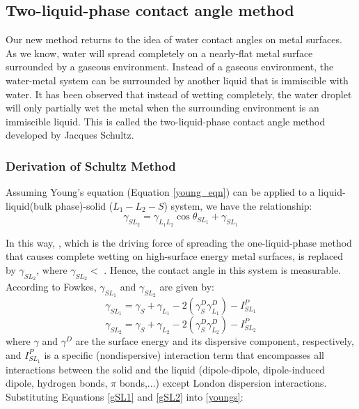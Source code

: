 \subsection{Two-liquid-phase contact angle method}

Our new method returns to the idea of water contact angles on metal surfaces. As we know, water will spread completely on a nearly-flat metal surface surrounded by a gaseous environment. Instead of a gaseous environment, the water-metal system can be surrounded by another liquid that is immiscible with water. It has been observed that instead of wetting completely, the water droplet will only partially wet the metal when the surrounding environment is an immiscible liquid. This is called the two-liquid-phase contact angle method developed by Jacques Schultz.\cite{Schultz1977,Schultz1977a,Schultz1992}

\subsubsection{Derivation of Schultz Method}
	
Assuming Young's equation (Equation \ref{young_eqn}) can be applied to a liquid-liquid(bulk phase)-solid ($L_{1}-L_{2}-S$) system, we have the relationship:
\begin{equation}
\label{youngs}
	\gamma_{SL_{2}} = \gamma_{L_{1}L_{2}}\cos\theta_{SL_{1}} + \gamma_{SL_{1}}
\end{equation}

In this way, \gamSV, which is the driving force of spreading the one-liquid-phase method that causes complete wetting on high-surface energy metal surfaces, is replaced by $ \gamma_{SL_{2}} $, where $\gamma_{SL_{2}} <$ \gamSV. Hence, the contact angle in this system is measurable. According to Fowkes\cite{Fowkes1964}, $\gamma_{SL_{1}}$ and $\gamma_{SL_{2}}$ are given by:
\begin{equation} 
\label{gSL1}
	\gamma_{SL_{1}} = \gamma_{S} + \gamma_{L_{1}} - 2(\gamma_{S}^{D}\gamma_{L_{1}}^{D}) - I_{SL_{1}}^{P}
\end{equation}
\begin{equation}
\label{gSL2}
	\gamma_{SL_{2}} = \gamma_{S} + \gamma_{L_{2}} - 2(\gamma_{S}^{D}\gamma_{L_{2}}^{D}) - I_{SL_{2}}^{P}
\end{equation} 
where $\gamma$ and $\gamma^{D}$ are the surface energy and its dispersive component, respectively, and $I_{SL_{1}}^{P}$ is a specific (nondispersive) interaction term that encompasses all interactions between the solid and the liquid (dipole-dipole, dipole-induced dipole, hydrogen bonds, $\pi$ bonds,...) except London dispersion interactions. 
Substituting Equations \ref{gSL1} and \ref{gSL2} into \ref{youngs}:

